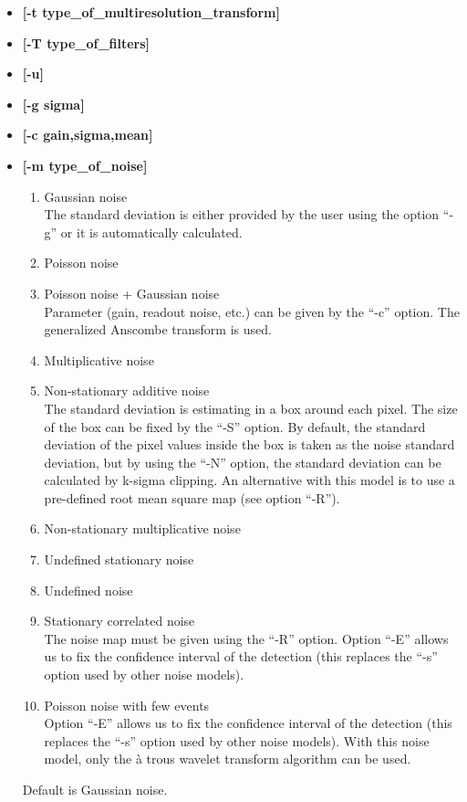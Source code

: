 \begin{itemize}
\begin{itemize}
\begin{enumerate}
\item SURE Soft Thresholding.
\item MULTI-SURE Hard Thresholding.
\item MULTI-SURE Soft Thresholding.
\item Median Absolute Deviation (MAD) Hard Thresholding.
\item Median Absolute Deviation (MAD) Soft Thresholding. 
\item Total Variation + Wavelet Constraint 
\item Wavelet Constraint Iterative Methods 
\end{enumerate}
Default is multiresolution thresholding.
\item {\bf [-t type\_of\_multiresolution\_transform]} 
\item {\bf [-T type\_of\_filters]}  
\item {\bf [-u]} 
\item {\bf [-g sigma]} 
\item {\bf [-c gain,sigma,mean]} 
\item {\bf [-m type\_of\_noise]}
\begin{enumerate}
\baselineskip=0.4truecm
\item Gaussian noise \\
The standard deviation is either provided by the user using the option ``-g''
or it is automatically calculated.
\item Poisson noise
\item Poisson noise + Gaussian noise \\
Parameter (gain, readout noise, etc.) can be given by the ``-c'' option.
The generalized Anscombe transform is used.
\item Multiplicative noise
\item Non-stationary additive noise \\
The standard deviation is estimating in a box around each pixel.
The size of the box can be fixed by the ``-S'' option. By default, the
standard deviation of the pixel values inside the box is taken as the
noise standard deviation, but by using the ``-N'' option, 
the standard deviation
can be calculated by k-sigma clipping. An alternative with this model is to
use a pre-defined root mean square map (see option ``-R'').
\item Non-stationary multiplicative noise
\item Undefined stationary noise
\item Undefined noise
\item Stationary correlated noise \\
The noise map must be given using the ``-R'' option.  
Option ``-E'' allows us to fix the confidence interval
of the detection (this replaces the ``-s'' option used by other noise models).    
\item Poisson noise with few events \\
Option ``-E'' allows us to fix the confidence interval
of the detection (this replaces the ``-s'' option used by other noise models).
With this noise model, only the \`a trous wavelet transform algorithm can
be used.
\end{enumerate}
Default is Gaussian noise.


\end{itemize}
\end{itemize}
